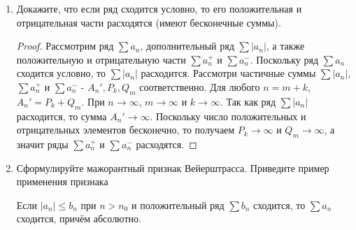 \documentclass[a4paper]{article}
\begin{document}
\begin{enumerate}
\begin{proof}
   			Рассмотрим ряд $\sum a_n$, дополнительный ряд $\sum |a_n|$, а также положительную и отрицательную части $\sum a_n^+$ и $\sum a_n^-$.
   			
   			1) Пусть ряд $\sum a_n$ сходится абсолютно. В таком случае ряд $\sum |a_n|$ сходится, а так как члены рядов $\sum a_n^+$ и $\sum a_n^-$ все содержатся в ряде $\sum |a_n|$, то для всех их частичных сумм справедливо следующее: $P_k \leqslant A_n'$ и $Q_m \leqslant A_n'$, где $P_k$ и $Q_m$ - частичные суммы положительной и отрицательной части соответственно, а $A_n'$ - частичная сумма дополнительного ряда и $A_n' = P_k + Q_m, n = m + k$. Это значит, что оба ряда $\sum a_n^+$ и $\sum a_n^-$ сходятся.
   			
   			2) Исходя из того, что $S_n = P_k - Q_m, n = m + k$ и положительных и отрицательных элементов в $\sum a_n$ бесконечное множество, мы получаем, что при $n \rightarrow \infty$ одновременно $m \rightarrow \infty$ и $k \rightarrow \infty$. Переходя к пределу получаем, что исходный ряд сходится абсолютно и его сумма будет равна $P - Q$.
   			
   			
   		\end{proof}
   	
   		\item Докажите, что если ряд сходится условно, то его положительная и отрицательная части расходятся (имеют бесконечные суммы).
   		
   		\begin{proof}
   			Рассмотрим ряд $\sum a_n$, дополнительный ряд $\sum |a_n|$, а также положительную и отрицательную части $\sum a_n^+$ и $\sum a_n^-$. Поскольку ряд $\sum a_n$ сходится условно, то $\sum |a_n|$ расходится. Рассмотри частичные суммы $\sum |a_n|$, $\sum a_n^+$ и $\sum a_n^-$ - $A_n', P_k, Q_m$ соответственно. Для любого $n = m + k$, $A_n' = P_k + Q_m$. При $n \rightarrow \infty$, $m \rightarrow \infty$ и $k \rightarrow \infty$. Так как ряд $\sum |a_n|$ расходится, то сумма $A_n' \rightarrow \infty$. Поскольку число положительных и отрицательных элементов бесконечно, то получаем $P_k \rightarrow \infty$ и $Q_m \rightarrow \infty$, а значит ряды $\sum a_n^+$ и $\sum a_n^-$ расходятся.
   		\end{proof}
           
        \item Сформулируйте мажорантный признак Вейерштрасса. Приведите пример применения признака
        
        \begin{theorem}
            Если $|a_n| \leq b_n$ при $n > n_0$ и положительный ряд $\sum b_n$ сходится,
            то $\sum a_n$ сходится, причём абсолютно.
        \end{theorem}
        

\end{enumerate}
\end{document}
